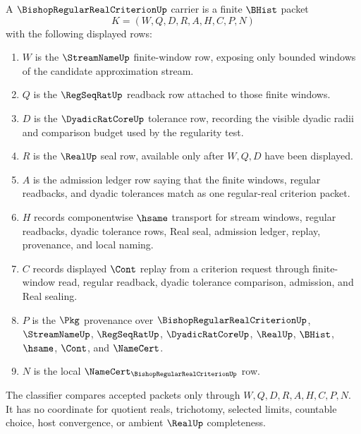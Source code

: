 \begin{definition}
\label{def:bishop-regular-real-criterion-carrier}
A $\BishopRegularRealCriterionUp$ carrier is a finite $\BHist$ packet
$$
K=(W,Q,D,R,A,H,C,P,N)
$$
with the following displayed rows:
\begin{enumerate}
\item $W$ is the $\StreamNameUp$ finite-window row, exposing only bounded windows of the candidate approximation stream.
\item $Q$ is the $\RegSeqRatUp$ readback row attached to those finite windows.
\item $D$ is the $\DyadicRatCoreUp$ tolerance row, recording the visible dyadic radii and comparison budget used by the regularity test.
\item $R$ is the $\RealUp$ seal row, available only after $W,Q,D$ have been displayed.
\item $A$ is the admission ledger row saying that the finite windows, regular readbacks, and dyadic tolerances match as one regular-real criterion packet.
\item $H$ records componentwise $\hsame$ transport for stream windows, regular readbacks, dyadic tolerance rows, Real seal, admission ledger, replay, provenance, and local naming.
\item $C$ records displayed $\Cont$ replay from a criterion request through finite-window read, regular readback, dyadic tolerance comparison, admission, and Real sealing.
\item $P$ is the $\Pkg$ provenance over $\BishopRegularRealCriterionUp$, $\StreamNameUp$, $\RegSeqRatUp$, $\DyadicRatCoreUp$, $\RealUp$, $\BHist$, $\hsame$, $\Cont$, and $\NameCert$.
\item $N$ is the local $\NameCert_{\BishopRegularRealCriterionUp}$ row.
\end{enumerate}
The classifier compares accepted packets only through $W,Q,D,R,A,H,C,P,N$. It has no coordinate for quotient reals, trichotomy, selected limits, countable choice, host convergence, or ambient $\RealUp$ completeness.
\end{definition}

